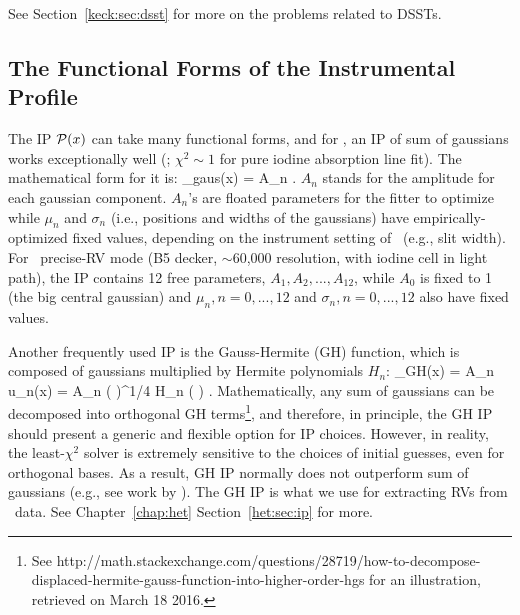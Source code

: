 See Section~\ref{keck:sec:dsst} for more on the problems related to DSSTs.




\subsection{The Functional Forms of the Instrumental Profile}\label{doppler:sec:ip}

The IP $\mathcal{P}(x)$ can take many functional forms, and for \keck, an
IP of sum of gaussians works exceptionally well
(\citealt{1995PASP..107..966V}; $\chi^2 \sim 1$ for pure iodine
absorption line fit). The mathematical form for it is:
\beq
\curlyp_{\rm gaus}(x) = \sum A_n . 
\eeq
$A_n$ stands for the amplitude for each gaussian component. $A_n$'s
are floated parameters for the fitter to optimize while $\mu_n$ and
$\sigma_n$ (i.e., positions and widths of the gaussians) have
empirically-optimized fixed values, depending on the instrument
setting of \keck\ (e.g., slit width). For \keck\ precise-RV mode (B5
decker, $\sim$60,000 resolution, with iodine cell in light path), the
IP contains 12 free parameters, $A_1, A_2, ..., A_{12}$, while $A_0$
is fixed to 1 (the big central gaussian) and $\mu_n, n=0,...,12$ and
$\sigma_n, n=0,...,12$ also have fixed values.

Another frequently used IP is the Gauss-Hermite (GH)
function, which is composed of gaussians multiplied by Hermite
polynomials $H_n$:
\beq
\curlyp_{\rm GH}(x) = \sum A_n u_n(x) = \sum A_n 
\left(  \right)^{1/4}  H_n
\left(  \right) .
\eeq
Mathematically, any sum of gaussians can be decomposed into orthogonal
GH terms\footnote{See
  http://math.stackexchange.com/questions/28719/how-to-decompose-displaced-hermite-gauss-function-into-higher-order-hgs
  for an illustration, retrieved on March 18 2016.}, and therefore, in
principle, the GH IP should present a generic and flexible option for
IP choices. However, in reality, the least-$\chi^2$ solver is
extremely sensitive to the choices of initial guesses, even for
orthogonal bases. As a result, GH IP normally does not outperform sum
of gaussians (e.g., see work by \citealt{2013AAS...22114908V}). The GH
IP is what we use for extracting RVs from \het\ data. See
Chapter~\ref{chap:het} Section~\ref{het:sec:ip} for more.



